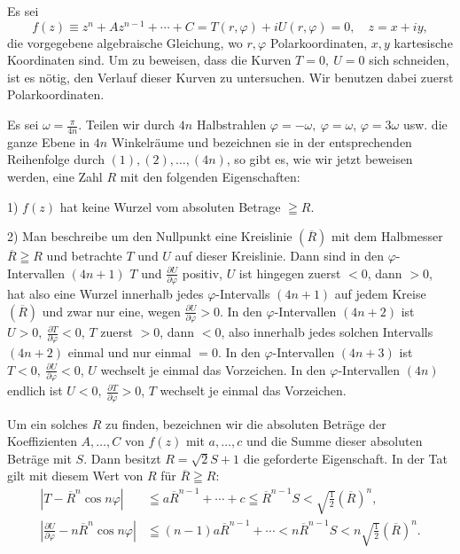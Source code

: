 \par\medskip
{} Es sei
\[
f(z)\equiv z^n+Az^{n-1}+\cdots+C=T(r,\varphi)+iU(r,\varphi)=0,\quad z=x+iy,
\]
die vorgegebene algebraische Gleichung, wo \(r,\varphi\) Polarkoordinaten, \(x,y\) kartesische
Koordinaten sind. Um zu beweisen, dass die Kurven \(T=0,\ U=0\)
sich schneiden, ist es nötig, den Verlauf dieser Kurven zu untersuchen. Wir
benutzen dabei zuerst Polarkoordinaten.
\par\clearpage{}
Es sei \(\omega=\frac{\pi}{4n}\). Teilen wir durch \(4n\) Halbstrahlen \(\varphi=-\omega,\ \varphi=\omega\),
\(\varphi=3\omega\) usw. die ganze Ebene in \(4n\) Winkelräume und bezeichnen sie in der
entsprechenden Reihenfolge durch \((1),(2),\ldots,(4n)\), so gibt es, wie wir jetzt
beweisen werden, eine Zahl \(R\) mit den folgenden Eigenschaften:
\par
1) \(f(z)\) hat keine Wurzel vom absoluten Betrage \(\geqq R\).
\par
2) Man beschreibe um den Nullpunkt eine Kreislinie \((\overline R)\) mit dem Halbmesser
\(\overline R\geqq R\) und betrachte \(T\) und \(U\) auf dieser Kreislinie. Dann sind in den \(\varphi\)-Intervallen
\((4n+1)\) \(T\) und \(\frac{\partial U}{\partial\varphi}\) positiv, \(U\) ist hingegen zuerst \(<0\), dann \(>0\), hat also eine
Wurzel innerhalb jedes \(\varphi\)-Intervalls \((4n+1)\) auf jedem Kreise \((\overline R)\) und zwar nur eine,
wegen \(\frac{\partial U}{\partial\varphi}>0\). In den \(\varphi\)-Intervallen \((4n+2)\) ist \(U>0,\ \frac{\partial T}{\partial\varphi}<0\), \(T\) zuerst
\(>0\), dann \(<0\), also innerhalb jedes solchen Intervalls \((4n+2)\) einmal und nur einmal
\(=0\). In den \(\varphi\)-Intervallen \((4n+3)\) ist \(T<0,\ \frac{\partial U}{\partial\varphi}<0\), \(U\) wechselt je einmal
das Vorzeichen. In den \(\varphi\)-Intervallen \((4n)\) endlich ist \(U<0,\ \frac{\partial T}{\partial\varphi}>0\),
\(T\) wechselt je einmal das Vorzeichen.
\par
Um ein solches \(R\) zu finden, bezeichnen wir die absoluten Beträge der
Koeffizienten \(A,\ldots,C\) von \(f(z)\) mit \(a,\ldots,c\) und die Summe dieser absoluten
Beträge mit \(S\). Dann besitzt \(R=\sqrt{2}S+1\) die geforderte Eigenschaft. In
der Tat gilt mit diesem Wert von \(R\) für \(\overline R\geqq R\):
\[
\begin{aligned}
|T-\overline R^n\cos n\varphi|&\leqq a\overline R^{n-1}+\cdots+c\leqq\overline R^{n-1}S<\sqrt{\tfrac12}(\overline R)^n,\\
\left|\frac{\partial U}{\partial\varphi}-n\overline R^n\cos n\varphi\right|&\leqq(n-1)a\overline R^{n-1}+\cdots<n\overline R^{n-1}S<n\sqrt{\tfrac12}(\overline R)^n.
\end{aligned}
\]
